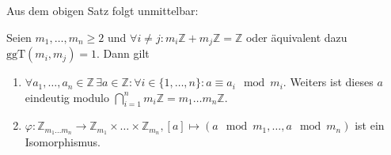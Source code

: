 Aus dem obigen Satz folgt unmittelbar:

\begin{corollary}
    Seien $m_1,\ldots,m_n\geq 2$ und $\forall i\neq j: m_i\mathbb{Z}+m_j\mathbb{Z}=\mathbb{Z}$
    oder äquivalent dazu $\text{ggT}(m_i,m_j)=1$. Dann gilt
    \begin{enumerate}
        \item $\forall a_1,\ldots,a_n\in\mathbb{Z}\,\exists a\in\mathbb{Z}:\forall i\in\{1,\ldots,n\}: a\equiv a_i \mod m_i$.
        Weiters ist dieses $a$ eindeutig modulo $\bigcap_{i=1}^{n}m_i\mathbb{Z}=m_1\ldots m_n\mathbb{Z}$.
        \item $\varphi:\mathbb{Z}_{m_1\ldots m_n}\to \mathbb{Z}_{m_1}\times\ldots\times \mathbb{Z}_{m_n}, [a]\mapsto (a\mod m_1,\ldots, a\mod m_n)$
        ist ein Isomorphismus.
    \end{enumerate}
\end{corollary}


